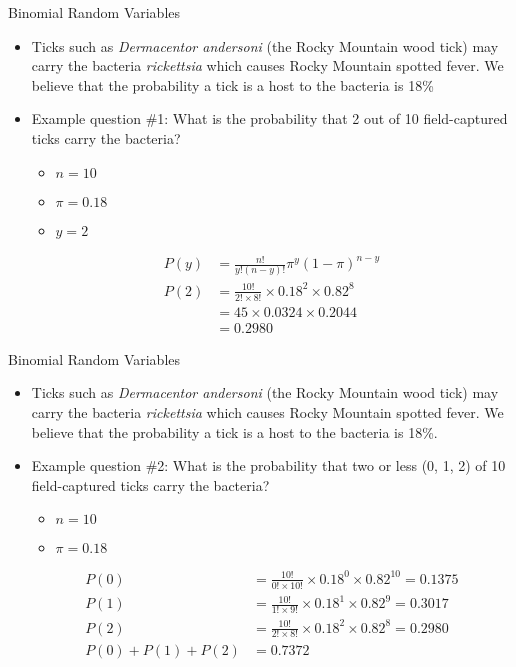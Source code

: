 \documentclass[xcolor=dvipsnames]{beamer}
\begin{document}
\begin{frame}{Binomial Random Variables}
	\begin{itemize}
		\item Ticks such as \emph{Dermacentor andersoni} (the Rocky Mountain wood tick) may carry the bacteria \emph{rickettsia} which causes Rocky Mountain spotted fever. We believe that the probability a tick is a host to the bacteria is 18\% \pause
		\item Example question \#1: What is the probability that 2 out of 10 field-captured ticks carry the bacteria? \pause
		\begin{itemize}
			\item $n = 10$
			\item $\pi = 0.18$
			\item $y = 2$
		\end{itemize} \pause
		\begin{align*}
			P(y) &= \frac{n!}{y!(n-y)!} \pi^y (1-\pi)^{n-y} \\
			P(2) &= \frac{10!}{2! \times 8!} \times 0.18^{2} \times 0.82^{8} \\
			&= 45 \times 0.0324 \times 0.2044 \\
			&= 0.2980
 		\end{align*}
	\end{itemize}
\end{frame}

\begin{frame}{Binomial Random Variables}
	\begin{itemize}
		\item Ticks such as \emph{Dermacentor andersoni} (the Rocky Mountain wood tick) may carry the bacteria \emph{rickettsia} which causes Rocky Mountain spotted fever. We believe that the probability a tick is a host to the bacteria is 18\%. \pause
		\item Example question \#2: What is the probability that two or less (0, 1, 2) of 10 field-captured ticks carry the bacteria? \pause
		\begin{itemize}
			\item $n = 10$
			\item $\pi = 0.18$
		\end{itemize} \pause
		\begin{align*}
		P(0) &= \frac{10!}{0! \times 10!} \times 0.18^{0} \times 0.82^{10} = 0.1375 \\
		P(1) &= \frac{10!}{1! \times 9!} \times 0.18^{1} \times 0.82^{9} = 0.3017 \\
		P(2) &= \frac{10!}{2! \times 8!} \times 0.18^{2} \times 0.82^{8} = 0.2980\\
		P(0) + P(1) + P(2) &= 0.7372
		\end{align*}
	\end{itemize}
\end{frame}
\end{document}
